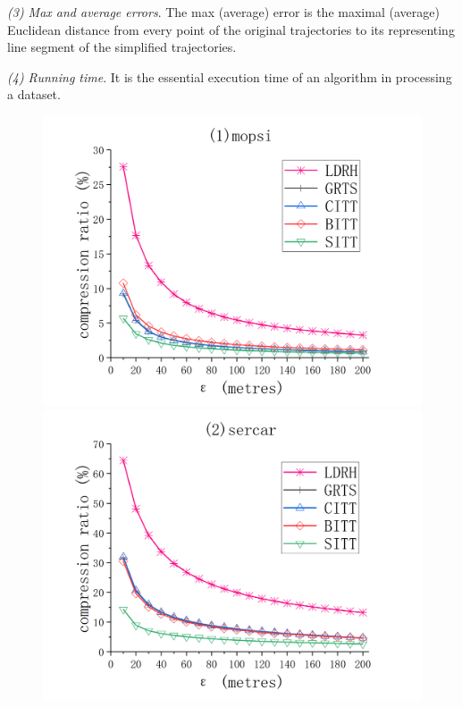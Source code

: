 { \ni \emph{(3) Max and average errors}. The max (average) error is the maximal (average) Euclidean distance from every point of the original trajectories to its representing line segment of the simplified trajectories.
 
 \ni \emph{(4) Running time}. It is the essential execution time of an algorithm in processing a dataset.
 



\begin{figure}[tb!]
	\centering
	\includegraphics[scale = 0.555]{figures/Fig-mopsi-compression-ratio.png}\hspace{0ex}
	\includegraphics[scale = 0.555]{figures/Fig-sercar-compression-ratio.png}\hspace{0ex}

\end{figure}}
